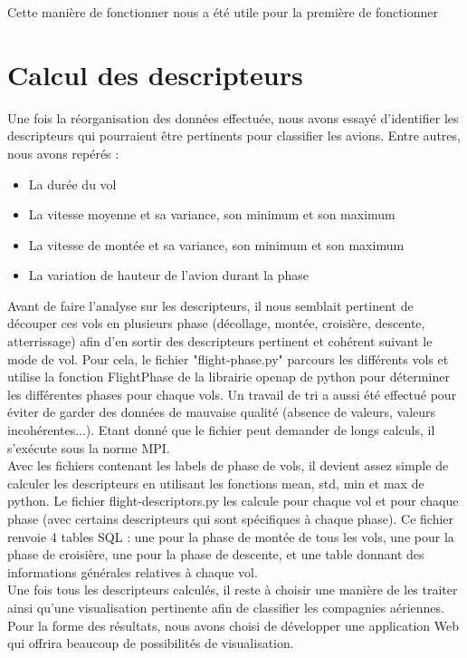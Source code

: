 Cette manière de fonctionner nous a été utile pour la première de fonctionner

\section*{Calcul des descripteurs}


Une fois la réorganisation des données effectuée, nous avons essayé d'identifier les descripteurs qui pourraient être pertinents pour classifier les avions. Entre autres, nous avons repérés : 

\begin{itemize}
	\item La durée du vol
	\item La vitesse moyenne et sa variance, son minimum et son maximum
	\item La vitesse de montée et sa variance, son minimum et son maximum
	\item La variation de hauteur de l'avion durant la phase
\end{itemize}

Avant de faire l'analyse sur les descripteurs, il nous semblait pertinent de découper ces vols en plusieurs phase (décollage, montée, croisière, descente, atterrissage) afin d'en sortir des descripteurs pertinent et cohérent suivant le mode de vol. Pour cela, le fichier "flight-phase.py" parcours les différents vols et utilise la fonction FlightPhase de la librairie openap de python pour déterminer les différentes phases pour chaque vols. Un travail de tri a aussi été effectué pour éviter de garder des données de mauvaise qualité (absence de valeurs, valeurs incohérentes...). Etant donné que le fichier peut demander de longs calculs, il s'exécute sous la norme MPI. \\


Avec les fichiers contenant les labels de phase de vols, il devient assez simple de calculer les descripteurs en utilisant les fonctions mean, std, min et max de python. Le fichier flight-descriptors.py les calcule pour chaque vol et pour chaque phase (avec certains descripteurs qui sont spécifiques à chaque phase). Ce fichier renvoie 4 tables SQL : une pour la phase de montée de tous les vols, une pour la phase de croisière, une pour la phase de descente, et une table donnant des informations générales relatives à chaque vol. \\

Une fois tous les descripteurs calculés, il reste à choisir une manière de les traiter ainsi qu'une visualisation pertinente afin de classifier les compagnies aériennes. Pour la forme des résultats, nous avons choisi de développer une application Web qui offrira beaucoup de possibilités de visualisation. \\


